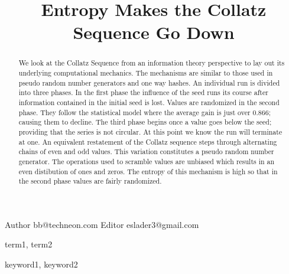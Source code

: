 \documentclass[preprint,natbib]{sigplanconf}
\begin{document}


\title{Entropy Makes the Collatz Sequence Go Down}

           {Author}
           {bb@techneon.com}
           {Editor}
           {eslader3@gmail.com}

\maketitle

\begin{abstract}
    We look at the Collatz Sequence from an information theory perspective to lay out its underlying computational mechanics. The mechanisms are similar to those used in pseudo random number generators and one way hashes.
    An individual run is divided into three phases.  In the first phase the influence of the seed runs its course after information contained in the initial seed is lost.  Values are randomized in the second phase.  They follow the statistical model where the average gain is just over 0.866; causing them to decline.  The third phase begins once a value goes below the seed; providing that the series is not circular.  At this point we know the run will terminate at one.
    An equivalent restatement of the Collatz sequence steps through alternating chains of even and odd values.  This variation constitutes a pseudo random number generator.  The operations used to scramble values are unbiased which results in an even distibution of ones and zeros.  The entropy of this mechanism is high so that in the second phase values are fairly randomized.
\end{abstract}


\terms
term1, term2

\keywords
keyword1, keyword2
\end{document}
